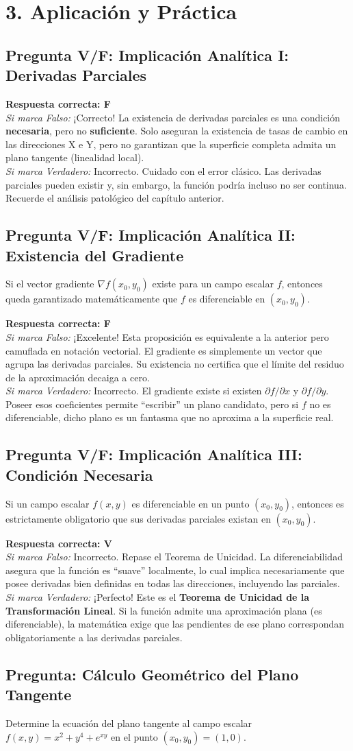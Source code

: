 \documentclass[11pt]{article}
\newenvironment{aplicacion}{%
  \section*{3. Aplicación y Práctica}%
}{}
\newenvironment{preguntaalternativas}[1]{\subsection*{Pregunta: #1}\par\vspace{0.1cm}}{\vspace{0.3cm}}
\newenvironment{preguntaverdaderofalso}[1]{\subsection*{Pregunta V/F: #1}\par\vspace{0.1cm}}{\vspace{0.3cm}}
\newcommand{\verdaderofalso}[3]{\par\noindent\textbf{Respuesta correcta: #1} \\ \textit{Si marca Falso:} #2 \\ \textit{Si marca Verdadero:} #3\par\vspace{0.15cm}}
\begin{document}
\begin{aplicacion}
\begin{preguntaverdaderofalso}{Implicación Analítica I: Derivadas Parciales}
    \verdaderofalso{F}
      {¡Correcto! La existencia de derivadas parciales es una condición \textbf{necesaria}, pero no \textbf{suficiente}. Solo aseguran la existencia de tasas de cambio en las direcciones X e Y, pero no garantizan que la superficie completa admita un plano tangente (linealidad local).}
      {Incorrecto. Cuidado con el error clásico. Las derivadas parciales pueden existir y, sin embargo, la función podría incluso no ser continua. Recuerde el análisis patológico del capítulo anterior.}
  \end{preguntaverdaderofalso}

  \begin{preguntaverdaderofalso}{Implicación Analítica II: Existencia del Gradiente}
    Si el vector gradiente $\nabla f(x_0, y_0)$ existe para un campo escalar $f$, entonces queda garantizado matemáticamente que $f$ es diferenciable en $(x_0, y_0)$.
    
    \verdaderofalso{F}
      {¡Excelente! Esta proposición es equivalente a la anterior pero camuflada en notación vectorial. El gradiente es simplemente un vector que agrupa las derivadas parciales. Su existencia no certifica que el límite del residuo de la aproximación decaiga a cero.}
      {Incorrecto. El gradiente existe si existen $\partial f/\partial x$ y $\partial f/\partial y$. Poseer esos coeficientes permite ``escribir'' un plano candidato, pero si $f$ no es diferenciable, dicho plano es un fantasma que no aproxima a la superficie real.}
  \end{preguntaverdaderofalso}

  \begin{preguntaverdaderofalso}{Implicación Analítica III: Condición Necesaria}
    Si un campo escalar $f(x,y)$ es diferenciable en un punto $(x_0,y_0)$, entonces es estrictamente obligatorio que sus derivadas parciales existan en $(x_0,y_0)$.
    
    \verdaderofalso{V}
      {Incorrecto. Repase el Teorema de Unicidad. La diferenciabilidad asegura que la función es ``suave'' localmente, lo cual implica necesariamente que posee derivadas bien definidas en todas las direcciones, incluyendo las parciales.}
      {¡Perfecto! Este es el \textbf{Teorema de Unicidad de la Transformación Lineal}. Si la función admite una aproximación plana (es diferenciable), la matemática exige que las pendientes de ese plano correspondan obligatoriamente a las derivadas parciales.}
  \end{preguntaverdaderofalso}

  \begin{preguntaalternativas}{Cálculo Geométrico del Plano Tangente}
    Determine la ecuación del plano tangente al campo escalar $f(x,y) = x^2 + y^4 + e^{xy}$ en el punto $(x_0, y_0) = (1, 0)$.
    

\end{preguntaalternativas}
\end{aplicacion}
\end{document}
